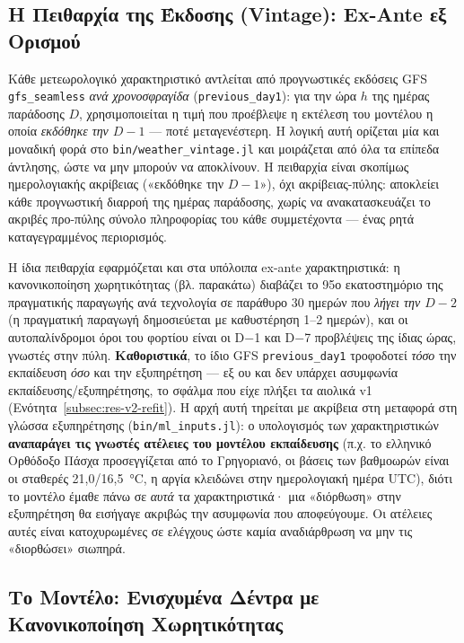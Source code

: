 \subsection{Η Πειθαρχία της Έκδοσης (Vintage): Ex-Ante εξ Ορισμού}
\label{subsec:vintage-discipline}

Κάθε μετεωρολογικό χαρακτηριστικό αντλείται από προγνωστικές εκδόσεις GFS \texttt{gfs\_seamless} \emph{ανά χρονοσφραγίδα} (\texttt{previous\_day1}): για την ώρα $h$ της ημέρας παράδοσης $D$, χρησιμοποιείται η τιμή που προέβλεψε η εκτέλεση του μοντέλου η οποία \emph{εκδόθηκε την $D-1$} --- ποτέ μεταγενέστερη. Η λογική αυτή ορίζεται μία και μοναδική φορά στο \texttt{bin/weather\_vintage.jl} και μοιράζεται από όλα τα επίπεδα άντλησης, ώστε να μην μπορούν να αποκλίνουν. Η πειθαρχία είναι σκοπίμως ημερολογιακής ακρίβειας («εκδόθηκε την $D-1$»), όχι ακρίβειας-πύλης: αποκλείει κάθε προγνωστική διαρροή της ημέρας παράδοσης, χωρίς να ανακατασκευάζει το ακριβές προ-πύλης σύνολο πληροφορίας του κάθε συμμετέχοντα --- ένας ρητά καταγεγραμμένος περιορισμός.

Η ίδια πειθαρχία εφαρμόζεται και στα υπόλοιπα ex-ante χαρακτηριστικά: η κανονικοποίηση χωρητικότητας (βλ. παρακάτω) διαβάζει το 95ο εκατοστημόριο της πραγματικής παραγωγής ανά τεχνολογία σε παράθυρο 30 ημερών που \emph{λήγει την $D-2$} (η πραγματική παραγωγή δημοσιεύεται με καθυστέρηση 1--2 ημερών), και οι αυτοπαλίνδρομοι όροι του φορτίου είναι οι D$-$1 και D$-$7 προβλέψεις της ίδιας ώρας, γνωστές στην πύλη. \textbf{Καθοριστικά}, το ίδιο GFS \texttt{previous\_day1} τροφοδοτεί \emph{τόσο} την εκπαίδευση \emph{όσο} και την εξυπηρέτηση --- εξ ου και δεν υπάρχει ασυμφωνία εκπαίδευσης/εξυπηρέτησης, το σφάλμα που είχε πλήξει τα αιολικά v1 (Ενότητα~\ref{subsec:res-v2-refit}). Η αρχή αυτή τηρείται με ακρίβεια στη μεταφορά στη γλώσσα εξυπηρέτησης (\texttt{bin/ml\_inputs.jl}): ο υπολογισμός των χαρακτηριστικών \textbf{αναπαράγει τις γνωστές ατέλειες του μοντέλου εκπαίδευσης} (π.χ. το ελληνικό Ορθόδοξο Πάσχα προσεγγίζεται από το Γρηγοριανό, οι βάσεις των βαθμοωρών είναι οι σταθερές 21,0/16,5~°C, η αργία κλειδώνει στην ημερολογιακή ημέρα UTC), διότι το μοντέλο έμαθε πάνω σε \emph{αυτά} τα χαρακτηριστικά· μια «διόρθωση» στην εξυπηρέτηση θα εισήγαγε ακριβώς την ασυμφωνία που αποφεύγουμε. Οι ατέλειες αυτές είναι κατοχυρωμένες σε ελέγχους ώστε καμία αναδιάρθρωση να μην τις «διορθώσει» σιωπηρά.

\subsection{Το Μοντέλο: Ενισχυμένα Δέντρα με Κανονικοποίηση Χωρητικότητας}
\label{subsec:input-model}

